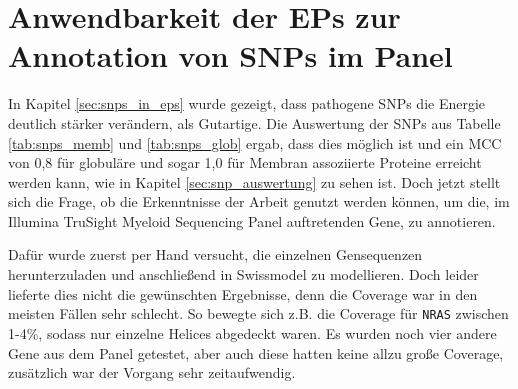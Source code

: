 \section{Anwendbarkeit der EPs zur Annotation von SNPs im Panel}

In Kapitel \ref{sec:snps_in_eps} wurde gezeigt, dass pathogene \ac{SNP}s die Energie deutlich stärker verändern, als Gutartige.  Die Auswertung der \ac{SNP}s aus Tabelle \ref{tab:snps_memb} und \ref{tab:snps_glob} ergab, dass dies möglich ist und ein MCC von 0,8 für globuläre und sogar 1,0 für Membran assoziierte Proteine erreicht werden kann, wie in Kapitel \ref{sec:snp_auswertung} zu sehen ist. Doch jetzt stellt sich die Frage, ob die Erkenntnisse der Arbeit genutzt werden können, um die, im Illumina TruSight Myeloid Sequencing Panel auftretenden Gene, zu annotieren. 

Dafür wurde zuerst per Hand versucht, die einzelnen Gensequenzen herunterzuladen und anschließend in Swissmodel zu modellieren. Doch leider lieferte dies nicht die gewünschten Ergebnisse, denn die Coverage war in den meisten Fällen sehr schlecht. So bewegte sich z.B. die Coverage für \texttt{NRAS} zwischen 1-4\%, sodass nur einzelne Helices abgedeckt waren. Es wurden noch vier andere Gene aus dem Panel getestet, aber auch diese hatten keine allzu große Coverage, zusätzlich war der Vorgang sehr zeitaufwendig. 

\begin{table}[]
    \centering
    \caption{Illumina TruSight Myeloid Sequencing Panel Gene \emph{coverage}, Transkriptlänge ist mit UTRs und CDS angegeben.}
    \label{tab:illumina_coverage}
\end{table}

